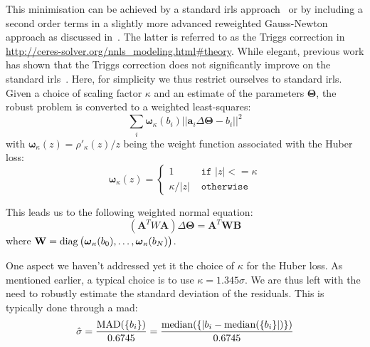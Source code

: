 This minimisation can be achieved by a standard \gls{irls} approach~\cite{Green:JRSSB:1984} or by including a second order terms in a slightly more advanced reweighted Gauss-Newton approach as discussed in~\cite{Triggs:VisAlg:2000}.
The latter is referred to as the Triggs correction in \url{http://ceres-solver.org/nnls_modeling.html#theory}. While elegant, previous work has shown that the Triggs correction does not significantly improve on the standard \gls{irls}~\cite{Zach:ECCV:2014,Zach:ECCV:2018}.
Here, for simplicity we thus restrict ourselves to standard \gls{irls}.
Given a choice of scaling factor $\kappa$ and an estimate of the parameters $\mathbf{\Theta}$, the robust problem is converted to a weighted least-squares:
\begin{equation}
\sum_i \boldsymbol{\omega}_\kappa(b_i) ||\mathbf{a}_i \Delta\mathbf{\Theta} - b_i||^2
\end{equation}
with $\boldsymbol{\omega}_\kappa(z) = \rho'_\kappa(z) / z$ being the weight function associated with the Huber loss:
\begin{equation}
\boldsymbol{\omega}_\kappa(z) =
\begin{cases}
  1 &\texttt{ if } |z| <= \kappa \\
  \kappa / |z|  &\texttt{ otherwise }
\end{cases}
\end{equation}

This leads us to the following weighted normal equation:
\begin{equation}
(\mathbf{A}^T W \mathbf{A}) \Delta\mathbf{\Theta} = \mathbf{A}^T \mathbf{W} \mathbf{B}
\end{equation}
where $\mathbf{W} = \operatorname{diag}\big(\boldsymbol{\omega}_\kappa(b_0), \ldots, \boldsymbol{\omega}_\kappa(b_N)\big)$.

One aspect we haven't addressed yet it the choice of $\kappa$ for the Huber loss. As mentioned earlier, a typical choice is to use $\kappa=1.345\sigma$. We are thus left with the need to robustly estimate the standard deviation of the residuals. This is typically done through a \gls{mad}:
\begin{equation}
\hat{\sigma} = \frac{\operatorname{MAD}(\{b_i\})}{0.6745} = \frac{\operatorname{median}(\{|b_i-\operatorname{median}(\{b_i\}|)\})}{0.6745}
\end{equation}

